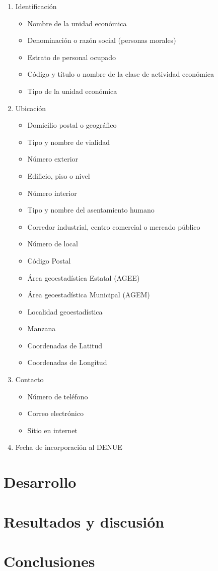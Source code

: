 \documentclass{article}
\begin{document}
\begin{enumerate}
    \item Identificación
    \begin{itemize}
        \item Nombre de la unidad económica
        \item Denominación o razón social (personas morales)
        \item Estrato de personal ocupado
        \item Código y título o nombre de la clase de actividad económica
        \item Tipo de la unidad económica
    \end{itemize}

    \item Ubicación
    \begin{itemize}
        \item Domicilio postal o geográfico
        \item Tipo y nombre de vialidad
        \item Número exterior
        \item Edificio, piso o nivel
        \item Número interior
        \item Tipo y nombre del asentamiento humano
        \item Corredor industrial, centro comercial o mercado público
        \item Número de local
        \item Código Postal
        \item Área geoestadística Estatal (AGEE)
        \item Área geoestadística Municipal (AGEM)
        \item Localidad geoestadística
        \item Manzana
        \item Coordenadas de Latitud
        \item Coordenadas de Longitud
    \end{itemize}

    \item Contacto
    \begin{itemize}
        \item Número de teléfono
        \item Correo electrónico
        \item Sitio en internet
    \end{itemize}
    \item Fecha de incorporación al DENUE
\end{enumerate}

\section{Desarrollo}


\section{Resultados y discusión}

\section{Conclusiones}
\end{document}
